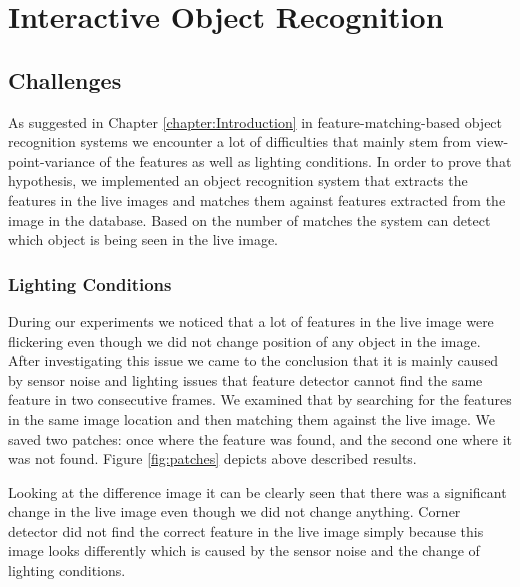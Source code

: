 \chapter{Interactive Object Recognition}
\label{chapter:Object Recognition}

\section{Challenges}
As suggested in Chapter \ref{chapter:Introduction} in feature-matching-based object recognition systems we encounter a lot of difficulties that mainly stem from view-point-variance of the features as well as lighting conditions. In order to prove that hypothesis, we implemented an object recognition system that extracts the features in the  live images and matches them against features extracted from the image in the database. Based on the number of matches the system can detect which object is being seen in the live image.

\subsection{Lighting Conditions}

During our experiments we noticed that a lot of features in the live image were flickering even though we did not change position of any object in the image. After investigating this issue we came to the conclusion that it is mainly caused by sensor noise and lighting issues that feature detector cannot find the same feature in two consecutive frames. We examined that by searching for the features in the same image location and then matching them against the live image. We saved two patches: once where the feature was found, and the second one where it was not found. Figure \ref{fig:patches} depicts above described results.

Looking at the difference image it can be clearly seen that there was a significant change in the live image even though we did not change anything. Corner detector did not find the correct feature in the live image simply because this image looks differently which is caused by the sensor noise and the change of lighting conditions.

